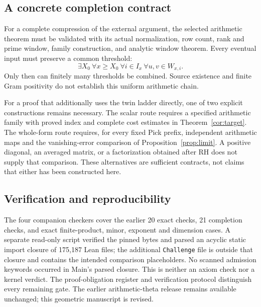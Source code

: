 \documentclass[11pt,letterpaper]{article}
\theoremstyle{definition}
\theoremstyle{remark}
\numberwithin{equation}{section}
\begin{document}
\subsection{A concrete completion contract}
For a complete compression of the external argument, the selected arithmetic theorem must be validated with its actual normalization, row count, rank and prime window, family construction, and analytic window theorem. Every eventual input must preserve a common threshold:
\[
 \exists X_0\ \forall x\ge X_0\ \forall i\in I_x\ \forall u,v\in W_{x,i}.
\]
Only then can finitely many thresholds be combined. Source existence and finite Gram positivity do not establish this uniform arithmetic chain.

For a proof that additionally uses the twin ladder directly, one of two explicit constructions remains necessary. The scalar route requires a specified arithmetic family with proved index and complete cost estimates in Theorem~\ref{cor:target}. The whole-form route requires, for every fixed Pick prefix, independent arithmetic maps and the vanishing-error comparison of Proposition~\ref{prop:limit}. A positive diagonal, an averaged matrix, or a factorization obtained after RH does not supply that comparison. These alternatives are sufficient contracts, not claims that either has been constructed here.

\subsection*{Verification and reproducibility}
The four companion checkers cover the earlier 20 exact checks, 21 completion checks, and exact finite-product, minor, exponent and dimension cases. A separate read-only script verified the pinned bytes and parsed an acyclic static import closure of 175,187 Lean files; the additional \texttt{Challenge} file is outside that closure and contains the intended comparison placeholders. No scanned admission keywords occurred in Main's parsed closure. This is neither an axiom check nor a kernel verdict. The proof-obligation register and verification protocol distinguish every remaining gate. The earlier arithmetic-theta release remains available unchanged; this geometric manuscript is revised.
\end{document}
